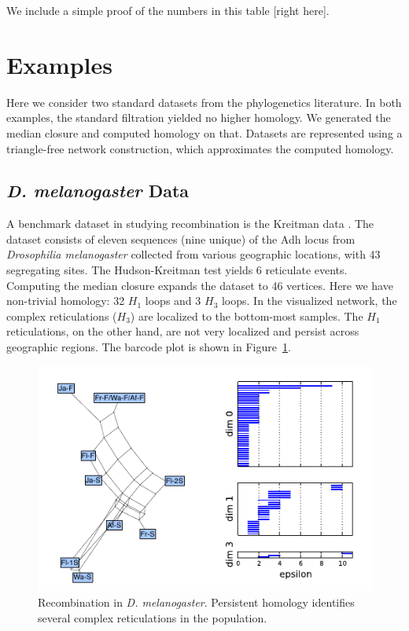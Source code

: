 We include a simple proof of the numbers in this table [right here].

\section{Examples}

Here we consider two standard datasets from the phylogenetics literature.
In both examples, the standard filtration yielded no higher homology.
We generated the median closure and computed homology on that.
Datasets are represented using a triangle-free network construction, which approximates the computed homology.

\subsection{{\textit{D. melanogaster}} Data}

A benchmark dataset in studying recombination is the Kreitman data \cite{Kreitman:1983}.
The dataset consists of eleven sequences (nine unique) of the Adh locus from \emph{Drosophilia melanogaster} collected from various geographic locations, with 43 segregating sites.
The Hudson-Kreitman test yields 6 reticulate events.
Computing the median closure expands the dataset to 46 vertices.
Here we have non-trivial homology: 32 $H_1$ loops and 3 $H_3$ loops.
In the visualized network, the complex reticulations ($H_3$) are localized to the bottom-most samples.
The $H_1$ reticulations, on the other hand, are not very localized and persist across geographic regions.
The barcode plot is shown in Figure~\ref{fig:kreitman}.

\begin{figure}
\centering
\includegraphics[width=\columnwidth]{fig/complex_construction/kreitman.pdf}
\caption[Recombination in \emph{D. melanogaster}]{Recombination in \emph{D. melanogaster}. Persistent homology identifies several complex reticulations in the population.}
\label{fig:kreitman}
\end{figure}

